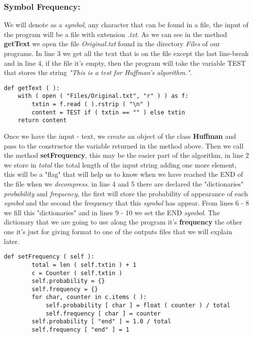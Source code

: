 \subsubsection{Symbol Frequency:}

We will denote as a {\itshape symbol}, any character that can be found in a file, the input of the program will be a file with extension {\itshape .txt}. As we can see in the method {\bfseries getText} we open the file {\itshape Original.txt} found in the directory {\itshape Files} of our programs. In line 3 we get all the text that is on the file except the last line-break and in line 4, if the file it's empty, then the program will take the variable TEST that stores the string {\itshape "This is a test for Huffman's algorithm."}. \hfill \break


\begin{lstlisting}
def getText ( ):
    with ( open ( "Files/Original.txt", "r" ) ) as f:
        txtin = f.read ( ).rstrip ( "\n" )
        content = TEST if ( txtin == "" ) else txtin
    return content
\end{lstlisting} \hfill

Once we have the input - text, we create an object of the class {\bfseries Huffman} and pass to the constructor the variable returned in the method above. Then we call the method {\bfseries setFrequency}, this may be the easier part of the algorithm, in line 2 we store in {\itshape total} the total length of the input string adding one more element, this will be a "flag" that will help us to know when we have reached the END of the file when we {\itshape decompress}. in line 4 and 5 there are declared the "dictionaries" {\itshape probability} and {\itshape frequency}, the first will store the probability of appearance of each {\itshape symbol} and the second the frequency that this {\itshape symbol} has appear. From lines 6 - 8 we fill this "dictionaries" and in lines 9 - 10 we set the END {\itshape symbol}. The dictionary that we are going to use along the program it's {\bfseries frequency} the other one it's just for giving format to one of the outputs files that we will explain later. \hfill \break

\begin{lstlisting}
def setFrequency ( self ):
        total = len ( self.txtin ) + 1
        c = Counter ( self.txtin )
        self.probability = {}
        self.frequency = {}
        for char, counter in c.items ( ):
            self.probability [ char ] = float ( counter ) / total
            self.frequency [ char ] = counter
        self.probability [ "end" ] = 1.0 / total
        self.frequency [ "end" ] = 1
\end{lstlisting} \hfill

